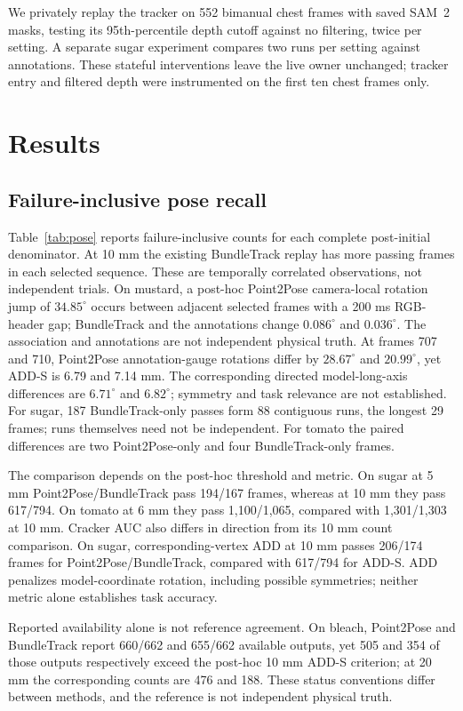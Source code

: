 \documentclass[10pt,journal]{IEEEtran}
\begin{document}
We privately replay the tracker on 552 bimanual chest frames with saved SAM~2 masks, testing its 95th-percentile depth cutoff against no filtering, twice per setting. A separate sugar experiment compares two runs per setting against annotations. These stateful interventions leave the live owner unchanged; tracker entry and filtered depth were instrumented on the first ten chest frames only.

\section{Results}
\subsection{Failure-inclusive pose recall}
Table~\ref{tab:pose} reports failure-inclusive counts for each complete post-initial denominator. At 10 mm the existing BundleTrack replay has more passing frames in each selected sequence. These are temporally correlated observations, not independent trials. On mustard, a post-hoc Point2Pose camera-local rotation jump of $34.85^\circ$ occurs between adjacent selected frames with a 200 ms RGB-header gap; BundleTrack and the annotations change $0.086^\circ$ and $0.036^\circ$. The association and annotations are not independent physical truth. At frames 707 and 710, Point2Pose annotation-gauge rotations differ by $28.67^\circ$ and $20.99^\circ$, yet ADD-S is 6.79 and 7.14 mm. The corresponding directed model-long-axis differences are $6.71^\circ$ and $6.82^\circ$; symmetry and task relevance are not established. For sugar, 187 BundleTrack-only passes form 88 contiguous runs, the longest 29 frames; runs themselves need not be independent. For tomato the paired differences are two Point2Pose-only and four BundleTrack-only frames.

The comparison depends on the post-hoc threshold and metric. On sugar at 5 mm Point2Pose/BundleTrack pass 194/167 frames, whereas at 10 mm they pass 617/794. On tomato at 6 mm they pass 1,100/1,065, compared with 1,301/1,303 at 10 mm. Cracker AUC also differs in direction from its 10 mm count comparison. On sugar, corresponding-vertex ADD at 10 mm passes 206/174 frames for Point2Pose/BundleTrack, compared with 617/794 for ADD-S. ADD penalizes model-coordinate rotation, including possible symmetries; neither metric alone establishes task accuracy.

Reported availability alone is not reference agreement. On bleach, Point2Pose and BundleTrack report 660/662 and 655/662 available outputs, yet 505 and 354 of those outputs respectively exceed the post-hoc 10 mm ADD-S criterion; at 20 mm the corresponding counts are 476 and 188. These status conventions differ between methods, and the reference is not independent physical truth.
\end{document}
